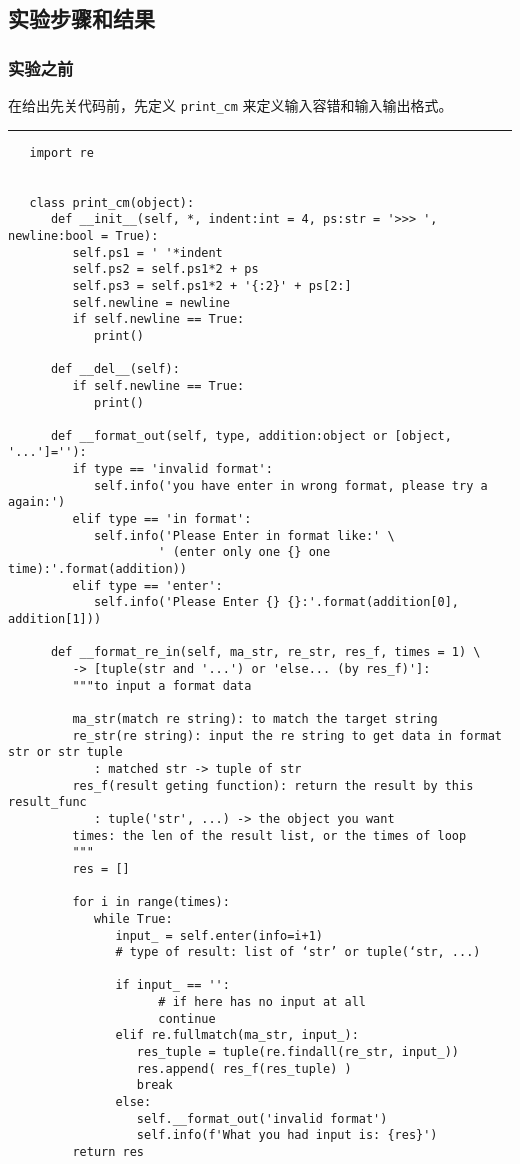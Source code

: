\documentclass[a4paper]{ctexart}
\newcommand{\lineiin}{
   \begin{center}
      \rule{\textwidth}{0.1pt}
   \end{center}
}
\begin{document}
   \subsection{实验步骤和结果}
      \subsubsection{实验之前}
      在给出先关代码前，先定义 \verb|print_cm| 来定义输入容错和输入输出格式。
   \lineiin
   \begin{verbatim}
   import re


   class print_cm(object):
      def __init__(self, *, indent:int = 4, ps:str = '>>> ', newline:bool = True):
         self.ps1 = ' '*indent
         self.ps2 = self.ps1*2 + ps
         self.ps3 = self.ps1*2 + '{:2}' + ps[2:]
         self.newline = newline
         if self.newline == True:
            print()
   
      def __del__(self):
         if self.newline == True:
            print()
   
      def __format_out(self, type, addition:object or [object, '...']=''):
         if type == 'invalid format':
            self.info('you have enter in wrong format, please try a again:')
         elif type == 'in format':
            self.info('Please Enter in format like:' \
                     ' (enter only one {} one time):'.format(addition))
         elif type == 'enter':
            self.info('Please Enter {} {}:'.format(addition[0], addition[1]))
   
      def __format_re_in(self, ma_str, re_str, res_f, times = 1) \
         -> [tuple(str and '...') or 'else... (by res_f)']:
         """to input a format data
   
         ma_str(match re string): to match the target string
         re_str(re string): input the re string to get data in format str or str tuple
            : matched str -> tuple of str
         res_f(result geting function): return the result by this result_func
            : tuple('str', ...) -> the object you want
         times: the len of the result list, or the times of loop
         """
         res = []
   
         for i in range(times):
            while True:
               input_ = self.enter(info=i+1)
               # type of result: list of ‘str’ or tuple(‘str, ...)
   
               if input_ == '':
                     # if here has no input at all
                     continue
               elif re.fullmatch(ma_str, input_):
                  res_tuple = tuple(re.findall(re_str, input_))
                  res.append( res_f(res_tuple) )
                  break
               else:
                  self.__format_out('invalid format')
                  self.info(f'What you had input is: {res}')
         return res
   

\end{verbatim}
\end{document}

